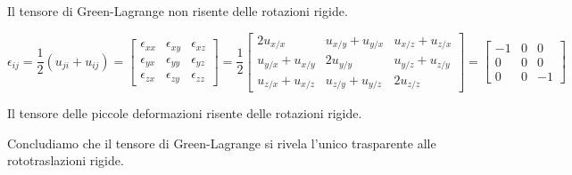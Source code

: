 Il tensore di Green-Lagrange non risente delle rotazioni rigide.

\begin{equation*}
\epsilon_{ij} = \frac{1}{2} \left( u_{ji} + u_{ij} \right)
= 
\begin{bmatrix}
\epsilon_{xx} & \epsilon_{xy} & \epsilon_{xz} \\
\epsilon_{yx} & \epsilon_{yy} & \epsilon_{yz} \\
\epsilon_{zx} & \epsilon_{zy} & \epsilon_{zz}
\end{bmatrix}
= 
\frac{1}{2}
\begin{bmatrix}
2 u_{x/x} & u_{x/y} + u_{y/x} & u_{x/z} + u_{z/x} \\
u_{y/x} + u_{x/y} & 2 u_{y/y} & u_{y/z} + u_{z/y} \\
u_{z/x} + u_{x/z} & u_{z/y} + u_{y/z} & 2 u_{z/z}
\end{bmatrix}
=
\begin{bmatrix}
-1 & 0 & 0 \\
0 & 0 & 0 \\
0 & 0 & -1
\end{bmatrix}
\end{equation*}

Il tensore delle piccole deformazioni risente delle rotazioni rigide.





Concludiamo che il tensore di Green-Lagrange si rivela l'unico trasparente alle rototraslazioni rigide.